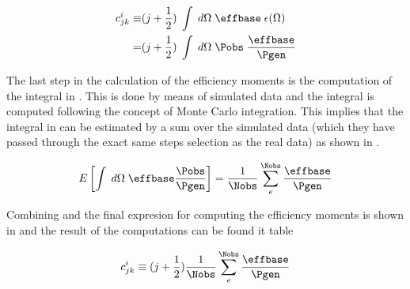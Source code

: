 \begin{center}
\begin{align}
   c^i_{jk}  \equiv &(j + \frac{1}{2}) \; \int \; d\Omega \; \effbase \; \epsilon(\Omega) \nonumber \\ 
                 = &(j + \frac{1}{2}) \; \int \; d\Omega \; \Pobs \; \frac{\effbase}{\Pgen}  
  \label{eff_moms_def}
\end{align}
\end{center}

\noindent The last step in the calculation of the efficiency moments is the computation of the integral in .
This is done by means of simulated data and the integral is computed following the concept of Monte Carlo integration. This implies
that the integral in  can be estimated by a sum over the simulated data (which they have passed through the exact
same steps selection as the real data) as shown in .   

\begin{center}
\begin{equation}
  E\left[ \int \; d\Omega \; \effbase \frac{\Pobs}{\Pgen} \right] = \frac{1}{\Nobs} \sum_e^{\Nobs} \frac{\effbase}{\Pgen}  
  \label{eff_moms_calc}
\end{equation}
\end{center}

\noindent Combining  and  the final expresion for computing the efficiency moments is shown
in  and the result of the computations can be found it table   

\begin{center}
\begin{equation}
 c^i_{jk} \equiv (j + \frac{1}{2})  \frac{1}{\Nobs} \sum_e^{\Nobs} \frac{\effbase}{\Pgen}  
  \label{eff_moms_calc_final}
\end{equation}
\end{center}

